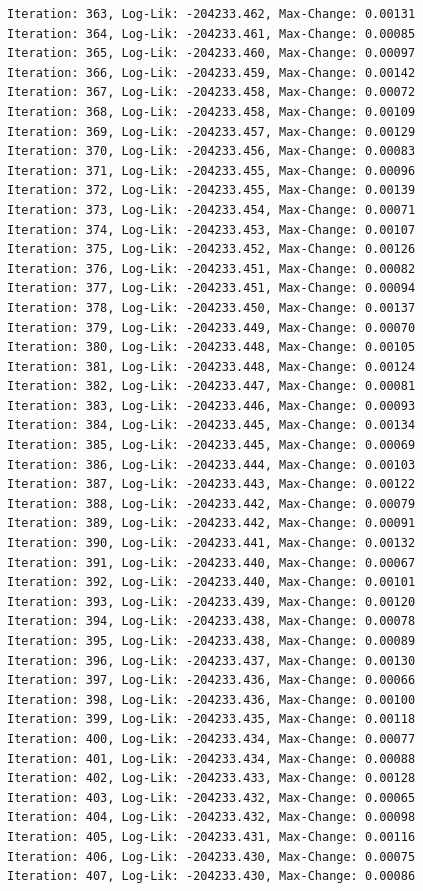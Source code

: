\documentclass[
  letterpaper,
  DIV=11,
  numbers=noendperiod]{scrreport}
\begin{document}
\begin{verbatim}
Iteration: 363, Log-Lik: -204233.462, Max-Change: 0.00131
Iteration: 364, Log-Lik: -204233.461, Max-Change: 0.00085
Iteration: 365, Log-Lik: -204233.460, Max-Change: 0.00097
Iteration: 366, Log-Lik: -204233.459, Max-Change: 0.00142
Iteration: 367, Log-Lik: -204233.458, Max-Change: 0.00072
Iteration: 368, Log-Lik: -204233.458, Max-Change: 0.00109
Iteration: 369, Log-Lik: -204233.457, Max-Change: 0.00129
Iteration: 370, Log-Lik: -204233.456, Max-Change: 0.00083
Iteration: 371, Log-Lik: -204233.455, Max-Change: 0.00096
Iteration: 372, Log-Lik: -204233.455, Max-Change: 0.00139
Iteration: 373, Log-Lik: -204233.454, Max-Change: 0.00071
Iteration: 374, Log-Lik: -204233.453, Max-Change: 0.00107
Iteration: 375, Log-Lik: -204233.452, Max-Change: 0.00126
Iteration: 376, Log-Lik: -204233.451, Max-Change: 0.00082
Iteration: 377, Log-Lik: -204233.451, Max-Change: 0.00094
Iteration: 378, Log-Lik: -204233.450, Max-Change: 0.00137
Iteration: 379, Log-Lik: -204233.449, Max-Change: 0.00070
Iteration: 380, Log-Lik: -204233.448, Max-Change: 0.00105
Iteration: 381, Log-Lik: -204233.448, Max-Change: 0.00124
Iteration: 382, Log-Lik: -204233.447, Max-Change: 0.00081
Iteration: 383, Log-Lik: -204233.446, Max-Change: 0.00093
Iteration: 384, Log-Lik: -204233.445, Max-Change: 0.00134
Iteration: 385, Log-Lik: -204233.445, Max-Change: 0.00069
Iteration: 386, Log-Lik: -204233.444, Max-Change: 0.00103
Iteration: 387, Log-Lik: -204233.443, Max-Change: 0.00122
Iteration: 388, Log-Lik: -204233.442, Max-Change: 0.00079
Iteration: 389, Log-Lik: -204233.442, Max-Change: 0.00091
Iteration: 390, Log-Lik: -204233.441, Max-Change: 0.00132
Iteration: 391, Log-Lik: -204233.440, Max-Change: 0.00067
Iteration: 392, Log-Lik: -204233.440, Max-Change: 0.00101
Iteration: 393, Log-Lik: -204233.439, Max-Change: 0.00120
Iteration: 394, Log-Lik: -204233.438, Max-Change: 0.00078
Iteration: 395, Log-Lik: -204233.438, Max-Change: 0.00089
Iteration: 396, Log-Lik: -204233.437, Max-Change: 0.00130
Iteration: 397, Log-Lik: -204233.436, Max-Change: 0.00066
Iteration: 398, Log-Lik: -204233.436, Max-Change: 0.00100
Iteration: 399, Log-Lik: -204233.435, Max-Change: 0.00118
Iteration: 400, Log-Lik: -204233.434, Max-Change: 0.00077
Iteration: 401, Log-Lik: -204233.434, Max-Change: 0.00088
Iteration: 402, Log-Lik: -204233.433, Max-Change: 0.00128
Iteration: 403, Log-Lik: -204233.432, Max-Change: 0.00065
Iteration: 404, Log-Lik: -204233.432, Max-Change: 0.00098
Iteration: 405, Log-Lik: -204233.431, Max-Change: 0.00116
Iteration: 406, Log-Lik: -204233.430, Max-Change: 0.00075
Iteration: 407, Log-Lik: -204233.430, Max-Change: 0.00086

\end{verbatim}
\end{document}
